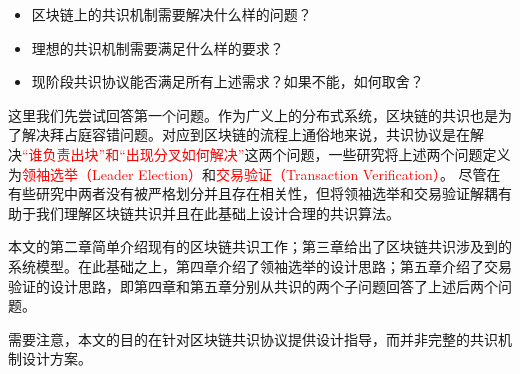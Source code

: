 \begin{itemize}
	\item 区块链上的共识机制需要解决什么样的问题？
	\item 理想的共识机制需要满足什么样的要求？
	\item 现阶段共识协议能否满足所有上述需求？如果不能，如何取舍？
\end{itemize}

这里我们先尝试回答第一个问题。作为广义上的分布式系统，区块链的共识也是为了解决拜占庭容错问题。对应到区块链的流程上通俗地来说，共识协议是在解决\textcolor{red}{“谁负责出块”和“出现分叉如何解决”}这两个问题\cite{ultrain2019}，一些研究将上述两个问题定义为\textcolor{red}{领袖选举（Leader Election）}和\textcolor{red}{交易验证（Transaction Verification）}\cite{kogias2016enhancing,gilad2017algorand,eyal2016bitcoin}。
尽管在有些研究中两者没有被严格划分并且存在相关性\cite{gilad2017algorand}，但将领袖选举和交易验证解耦有助于我们理解区块链共识并且在此基础上设计合理的共识算法。

本文的第二章简单介绍现有的区块链共识工作；第三章给出了区块链共识涉及到的系统模型。在此基础之上，第四章介绍了领袖选举的设计思路；第五章介绍了交易验证的设计思路，即第四章和第五章分别从共识的两个子问题回答了上述后两个问题。

需要注意，本文的目的在针对区块链共识协议提供设计指导，而并非完整的共识机制设计方案。



